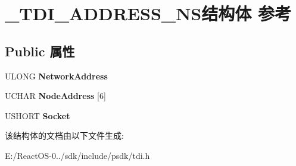 \hypertarget{struct___t_d_i___a_d_d_r_e_s_s___n_s}{}\section{\+\_\+\+T\+D\+I\+\_\+\+A\+D\+D\+R\+E\+S\+S\+\_\+\+N\+S结构体 参考}
\label{struct___t_d_i___a_d_d_r_e_s_s___n_s}
\subsection*{Public 属性}
\begin{DoxyCompactItemize}
\item 
\mbox{\label{struct___t_d_i___a_d_d_r_e_s_s___n_s_a87456256866a4f809df50302bf6084c7}} 
U\+L\+O\+NG {\bfseries Network\+Address}
\item 
\mbox{\label{struct___t_d_i___a_d_d_r_e_s_s___n_s_a1b5e8e514316a4c7166e534122ab9bd7}} 
U\+C\+H\+AR {\bfseries Node\+Address} \mbox{[}6\mbox{]}
\item 
\mbox{\label{struct___t_d_i___a_d_d_r_e_s_s___n_s_a00be6bdeaf1e12f76017efdf221b10dd}} 
U\+S\+H\+O\+RT {\bfseries Socket}
\end{DoxyCompactItemize}


该结构体的文档由以下文件生成\+:\begin{DoxyCompactItemize}
\item 
E\+:/\+React\+O\+S-\/0../sdk/include/psdk/tdi.\+h\end{DoxyCompactItemize}
